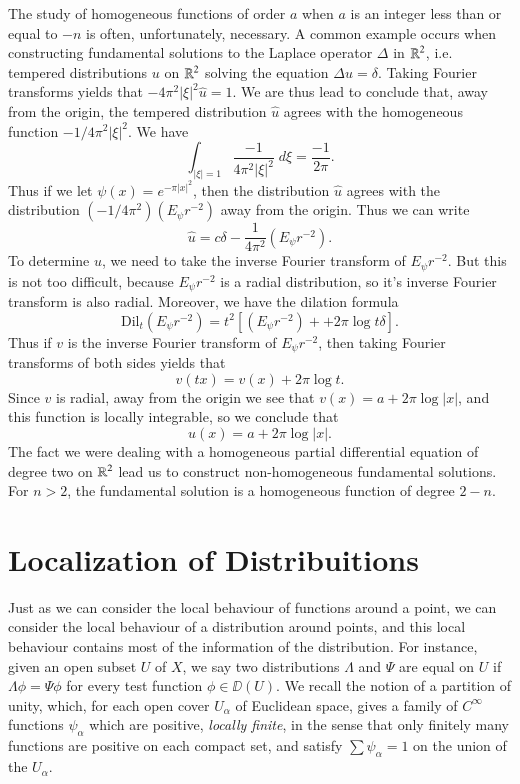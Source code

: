 The study of homogeneous functions of order $a$ when $a$ is an integer less than or equal to $-n$ is often, unfortunately, necessary. A common example occurs when constructing fundamental solutions to the Laplace operator $\Delta$ in $\operatorname{\mathbb{R}}^2$, i.e. tempered distributions $u$ on $\operatorname{\mathbb{R}}^2$ solving the equation $\Delta u = \delta$. Taking Fourier transforms yields that $-4 \pi^2 |\xi|^2 \widehat{u} = 1$. We are thus lead to conclude that, away from the origin, the tempered distribution $\widehat{u}$ agrees with the homogeneous function $-1 / 4 \pi^2 |\xi|^2$. We have
%
\[ \int_{|\xi| = 1} \frac{-1}{4 \pi^2 |\xi|^2}\; d\xi = \frac{-1}{2 \pi}. \]
%
Thus if we let $\psi(x) = e^{- \pi |x|^2}$, then the distribution $\widehat{u}$ agrees with the distribution $(-1 / 4\pi^2) (E_\psi r^{-2})$ away from the origin. Thus we can write
%
\[ \widehat{u} = c \delta - \frac{1}{4 \pi^2} \left( E_\psi r^{-2} \right). \]
%
To determine $u$, we need to take the inverse Fourier transform of $E_\psi r^{-2}$. But this is not too difficult, because $E_\psi r^{-2}$ is a radial distribution, so it's inverse Fourier transform is also radial. Moreover, we have the dilation formula
%
\[ \text{Dil}_t \left( E_\psi r^{-2} \right) = t^2 \left[ \left( E_\psi r^{-2} \right) + + 2 \pi \log t \delta \right]. \]
%
Thus if $v$ is the inverse Fourier transform of $E_\psi r^{-2}$, then taking Fourier transforms of both sides yields that
%
\[ v(tx) = v(x) + 2 \pi \log t. \]
%
Since $v$ is radial, away from the origin we see that $v(x) = a + 2 \pi \log |x|$, and this function is locally integrable, so we conclude that
%
\[ u(x) = a + 2 \pi \log |x|. \]
%
The fact we were dealing with a homogeneous partial differential equation of degree two on $\operatorname{\mathbb{R}}^2$ lead us to construct non-homogeneous fundamental solutions. For $n > 2$, the fundamental solution is a homogeneous function of degree $2-n$.

\section{Localization of Distribuitions}

Just as we can consider the local behaviour of functions around a point, we can consider the local behaviour of a distribution around points, and this local behaviour contains most of the information of the distribution. For instance, given an open subset $U$ of $X$, we say two distributions $\Lambda$ and $\Psi$ are equal on $U$ if $\Lambda \phi = \Psi \phi$ for every test function $\phi \in \DD(U)$. We recall the notion of a partition of unity, which, for each open cover $U_\alpha$ of Euclidean space, gives a family of $C^\infty$ functions $\psi_\alpha$ which are positive, {\it locally finite}, in the sense that only finitely many functions are positive on each compact set, and satisfy $\sum \psi_\alpha = 1$ on the union of the $U_\alpha$.

